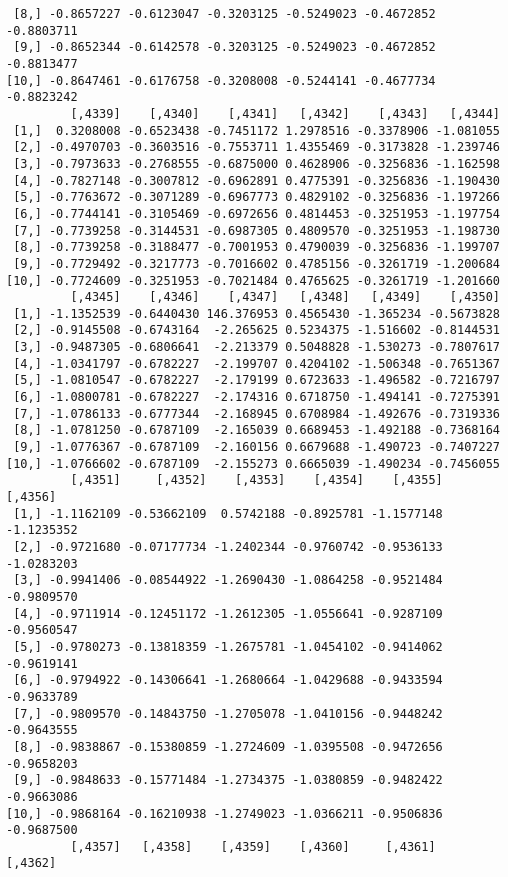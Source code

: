 \documentclass[
  letterpaper,
  DIV=11,
  numbers=noendperiod]{scrreprt}
\begin{document}
\begin{verbatim}
 [8,] -0.8657227 -0.6123047 -0.3203125 -0.5249023 -0.4672852 -0.8803711
 [9,] -0.8652344 -0.6142578 -0.3203125 -0.5249023 -0.4672852 -0.8813477
[10,] -0.8647461 -0.6176758 -0.3208008 -0.5244141 -0.4677734 -0.8823242
         [,4339]    [,4340]    [,4341]   [,4342]    [,4343]   [,4344]
 [1,]  0.3208008 -0.6523438 -0.7451172 1.2978516 -0.3378906 -1.081055
 [2,] -0.4970703 -0.3603516 -0.7553711 1.4355469 -0.3173828 -1.239746
 [3,] -0.7973633 -0.2768555 -0.6875000 0.4628906 -0.3256836 -1.162598
 [4,] -0.7827148 -0.3007812 -0.6962891 0.4775391 -0.3256836 -1.190430
 [5,] -0.7763672 -0.3071289 -0.6967773 0.4829102 -0.3256836 -1.197266
 [6,] -0.7744141 -0.3105469 -0.6972656 0.4814453 -0.3251953 -1.197754
 [7,] -0.7739258 -0.3144531 -0.6987305 0.4809570 -0.3251953 -1.198730
 [8,] -0.7739258 -0.3188477 -0.7001953 0.4790039 -0.3256836 -1.199707
 [9,] -0.7729492 -0.3217773 -0.7016602 0.4785156 -0.3261719 -1.200684
[10,] -0.7724609 -0.3251953 -0.7021484 0.4765625 -0.3261719 -1.201660
         [,4345]    [,4346]    [,4347]   [,4348]   [,4349]    [,4350]
 [1,] -1.1352539 -0.6440430 146.376953 0.4565430 -1.365234 -0.5673828
 [2,] -0.9145508 -0.6743164  -2.265625 0.5234375 -1.516602 -0.8144531
 [3,] -0.9487305 -0.6806641  -2.213379 0.5048828 -1.530273 -0.7807617
 [4,] -1.0341797 -0.6782227  -2.199707 0.4204102 -1.506348 -0.7651367
 [5,] -1.0810547 -0.6782227  -2.179199 0.6723633 -1.496582 -0.7216797
 [6,] -1.0800781 -0.6782227  -2.174316 0.6718750 -1.494141 -0.7275391
 [7,] -1.0786133 -0.6777344  -2.168945 0.6708984 -1.492676 -0.7319336
 [8,] -1.0781250 -0.6787109  -2.165039 0.6689453 -1.492188 -0.7368164
 [9,] -1.0776367 -0.6787109  -2.160156 0.6679688 -1.490723 -0.7407227
[10,] -1.0766602 -0.6787109  -2.155273 0.6665039 -1.490234 -0.7456055
         [,4351]     [,4352]    [,4353]    [,4354]    [,4355]    [,4356]
 [1,] -1.1162109 -0.53662109  0.5742188 -0.8925781 -1.1577148 -1.1235352
 [2,] -0.9721680 -0.07177734 -1.2402344 -0.9760742 -0.9536133 -1.0283203
 [3,] -0.9941406 -0.08544922 -1.2690430 -1.0864258 -0.9521484 -0.9809570
 [4,] -0.9711914 -0.12451172 -1.2612305 -1.0556641 -0.9287109 -0.9560547
 [5,] -0.9780273 -0.13818359 -1.2675781 -1.0454102 -0.9414062 -0.9619141
 [6,] -0.9794922 -0.14306641 -1.2680664 -1.0429688 -0.9433594 -0.9633789
 [7,] -0.9809570 -0.14843750 -1.2705078 -1.0410156 -0.9448242 -0.9643555
 [8,] -0.9838867 -0.15380859 -1.2724609 -1.0395508 -0.9472656 -0.9658203
 [9,] -0.9848633 -0.15771484 -1.2734375 -1.0380859 -0.9482422 -0.9663086
[10,] -0.9868164 -0.16210938 -1.2749023 -1.0366211 -0.9506836 -0.9687500
         [,4357]   [,4358]    [,4359]    [,4360]     [,4361]    [,4362]

\end{verbatim}
\end{document}
